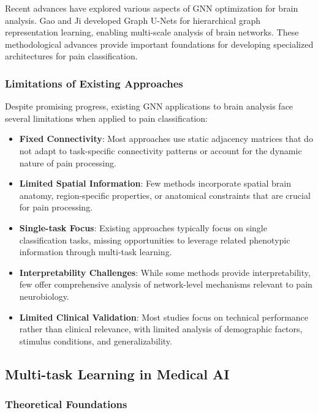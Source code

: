 \documentclass[10pt,journal,compsoc]{IEEEtran}
\begin{document}
Recent advances have explored various aspects of GNN optimization for brain analysis. Gao and Ji \cite{gao2019graph} developed Graph U-Nets for hierarchical graph representation learning, enabling multi-scale analysis of brain networks. These methodological advances provide important foundations for developing specialized architectures for pain classification.

\subsubsection{Limitations of Existing Approaches}

Despite promising progress, existing GNN applications to brain analysis face several limitations when applied to pain classification:

\begin{itemize}
\item \textbf{Fixed Connectivity}: Most approaches use static adjacency matrices that do not adapt to task-specific connectivity patterns or account for the dynamic nature of pain processing.

\item \textbf{Limited Spatial Information}: Few methods incorporate spatial brain anatomy, region-specific properties, or anatomical constraints that are crucial for pain processing.

\item \textbf{Single-task Focus}: Existing approaches typically focus on single classification tasks, missing opportunities to leverage related phenotypic information through multi-task learning.

\item \textbf{Interpretability Challenges}: While some methods provide interpretability, few offer comprehensive analysis of network-level mechanisms relevant to pain neurobiology.

\item \textbf{Limited Clinical Validation}: Most studies focus on technical performance rather than clinical relevance, with limited analysis of demographic factors, stimulus conditions, and generalizability.
\end{itemize}

\subsection{Multi-task Learning in Medical AI}

\subsubsection{Theoretical Foundations}
\end{document}
